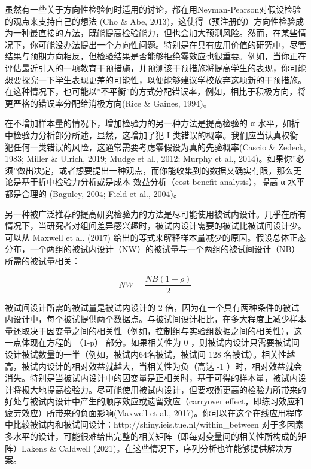 \documentclass[
  letterpaper,
  DIV=11,
  numbers=noendperiod]{scrreprt}
\begin{document}
虽然有一些关于方向性检验何时适用的讨论，都在用Neyman-Pearson对假设检验的观点来支持自己的想法
(Cho \& Abe,
2013)，这使得（预注册的）方向性检验成为一种最直接的方法，既能提高检验能力，但也会加大预测风险。然而，在某些情况下，你可能没办法提出一个方向性问题。特别是在具有应用价值的研究中，尽管结果与预期方向相反，但检验结果是否能够拒绝零效应也很重要。例如，当你正在评估最近引入的一项教育干预措施，并预测该干预措施将提高学生的表现，你可能想要探究一下学生表现更差的可能性，以便能够建议学校放弃这项新的干预措施。在这种情况下，也可能以''不平衡''的方式分配错误率，例如，相比于积极方向，将更严格的错误率分配给消极方向(Rice
\& Gaines, 1994)。

在不增加样本量的情况下，增加检验力的另一种方法是提高检验的 α
水平，如折中检验力分析部分所述，显然，这增加了犯 I
类错误的概率。我们应当认真权衡犯任何一类错误的风险，这通常需要考虑零假设为真的先验概率(Cascio
\& Zedeck, 1983; Miller \& Ulrich, 2019; Mudge et al., 2012; Murphy et
al.,
2014)。如果你''必须''做出决定，或者想要提出一种观点，而你能收集到的数据又确实有限，那么无论是基于折中检验力分析或是成本-效益分析（cost-benefit
analysis），提高 α 水平都是合理的 (Baguley, 2004; Field et al., 2004)。

另一种被广泛推荐的提高研究检验力的方法是尽可能使用被试内设计。几乎在所有情况下，当研究者对组间差异感兴趣时，被试内设计需要的被试比被试间设计少。可以从
Maxwell et al. (2017)
给出的等式来解释样本量减少的原因。假设总体正态分布，一个两组的被试内设计（NW）的被试量与一个两组的被试间设计（NB）所需的被试量相关：

\[NW = \frac{NB (1-\rho)}{2}\]

被试间设计所需的被试量是被试内设计的 2
倍，因为在一个具有两种条件的被试内设计中，每个被试提供两个数据点。与被试间设计相比，在多大程度上减少样本量还取决于因变量之间的相关性（例如，控制组与实验组数据之间的相关性），这一点体现在方程的
（1-p） 部分。如果相关性为 0
，则被试内设计只需要被试间设计被试数量的一半（例如，被试内64名被试，被试间
128 名被试）。相关性越高，被试内设计的相对效益就越大，当相关性为负（高达
-1
）时，相对效益就会消失。特别是当被试内设计中的因变量是正相关时，基于可得的样本量，被试内设计将极大地提高检验力。尽可能使用被试内设计，但要权衡更高的检验力所带来的好处与被试内设计中产生的顺序效应或遗留效应（carryover
effect，即练习效应和疲劳效应）所带来的负面影响(Maxwell et al.,
2017)。你可以在这个在线应用程序中比较被试内和被试间设计：http://shiny.ieis.tue.nl/within\_between
对于多因素多水平的设计，可能很难给出完整的相关矩阵（即每对变量间的相关性所构成的矩阵）Lakens
\& Caldwell (2021)。在这些情况下，序列分析也许能够提供解决方案。
\end{document}
